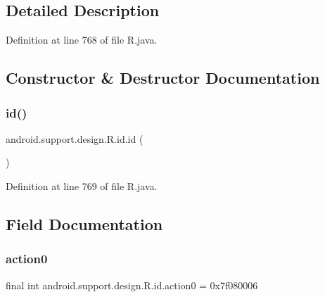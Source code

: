 \subsection{Detailed Description}


Definition at line 768 of file R.\+java.



\subsection{Constructor \& Destructor Documentation}
\mbox{\label{classandroid_1_1support_1_1design_1_1_r_1_1id_a50ff9c45db6e42295d0d7771e50055f7}} 
\subsubsection{\texorpdfstring{id()}{id()}}
{\footnotesize\ttfamily android.\+support.\+design.\+R.\+id.\+id (\begin{DoxyParamCaption}{ }\end{DoxyParamCaption})\hspace{0.3cm}{\ttfamily [private]}}



Definition at line 769 of file R.\+java.


\begin{DoxyCode}{0}

\end{DoxyCode}


\subsection{Field Documentation}
\mbox{\label{classandroid_1_1support_1_1design_1_1_r_1_1id_a65ca78d6559d5c73324d48f61d2af87e}} 
\subsubsection{\texorpdfstring{action0}{action0}}
{\footnotesize\ttfamily final int android.\+support.\+design.\+R.\+id.\+action0 = 0x7f080006\hspace{0.3cm}{\ttfamily [static]}}



